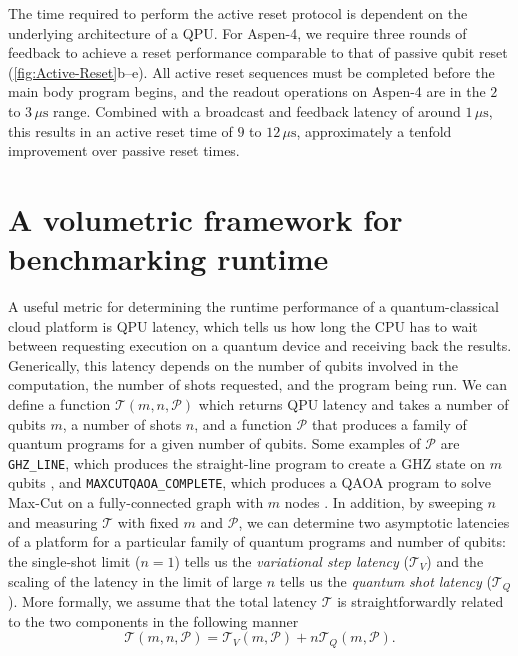 \documentclass[12pt]{iopart}
\begin{document}
The time required to perform the active reset protocol is dependent on the underlying architecture of a QPU. For Aspen-4, we require three rounds of feedback to achieve a reset performance comparable to that of passive qubit reset (\cref{fig:Active-Reset}b--e). All active reset sequences must be completed before the main body program begins, and the readout operations on Aspen-4 are in the $2$ to $3\,\mu\mathrm{s}$ range. Combined with a broadcast and feedback latency of around $1\,\mu\mathrm{s}$, this results in an active reset time of $9$ to $12\,\mu\mathrm{s}$, approximately a tenfold improvement over passive reset times.

\section{A volumetric framework for benchmarking runtime}

A useful metric for determining the runtime performance of a quantum-classical cloud platform is QPU latency, which tells us how long the CPU has to wait between requesting execution on a quantum device and receiving back the results. Generically, this latency depends on the number of qubits involved in the computation, the number of shots requested, and the program being run. We can define a function $\mathcal{T}(m,n,\mathcal{P})$ which returns QPU latency and takes a number of qubits $m$, a number of shots $n$, and a function $\mathcal{P}$ that produces a family of quantum programs for a given number of qubits. Some examples of $\mathcal{P}$ are \verb|GHZ_LINE|, which produces the straight-line program to create a GHZ state on $m$ qubits \cite{GHZState}, and \verb|MAXCUTQAOA_COMPLETE|, which produces a QAOA program to solve Max-Cut on a fully-connected graph with $m$ nodes \cite{FarhiQAOA}. In addition, by sweeping $n$ and measuring $\mathcal{T}$ with fixed $m$ and $\mathcal{P}$, we can determine two asymptotic latencies of a platform for a particular family of quantum programs and number of qubits: the single-shot limit ($n=1$) tells us the \textit{variational step latency} ($\mathcal{T}_V$) and the scaling of the latency in the limit of large $n$ tells us the \textit{quantum shot latency} ($\mathcal{T}_Q$). More formally, we assume that the total latency $\mathcal{T}$ is straightforwardly related to the two components in the following manner
\begin{equation}
    \mathcal{T}(m, n, \mathcal{P}) = \mathcal{T}_{V}(m, \mathcal{P}) + n \mathcal{T}_{Q}(m, \mathcal{P}).
\end{equation}
\end{document}
